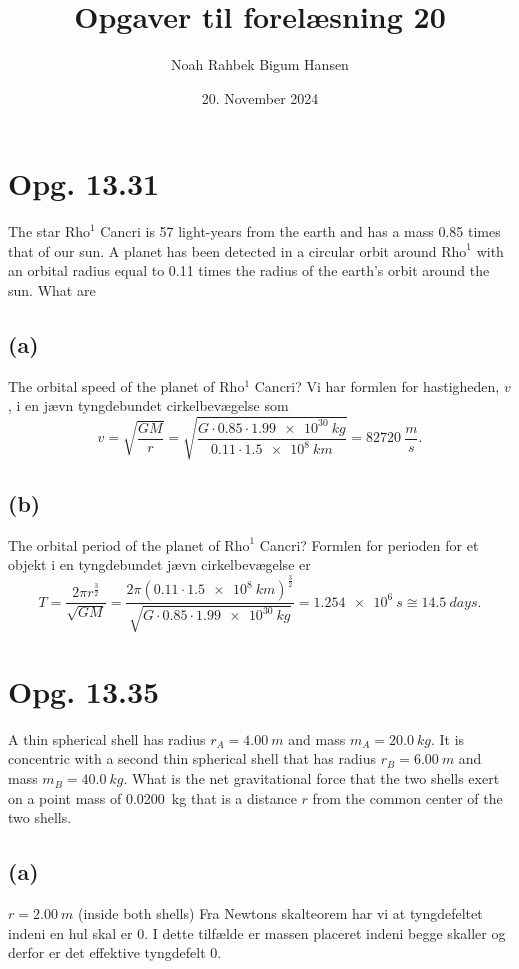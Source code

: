 \documentclass[12pt]{article}
\title{Opgaver til forelæsning 20}
\author{Noah Rahbek Bigum Hansen}
\date{20. November 2024}
\theoremstyle{definition}
\begin{document}
\maketitle

\section*{Opg. 13.31}
The star $\mathrm{Rho}^1$ Cancri is 57 light-years from the earth and has a mass \num{0,85} times that of our sun. A planet has been detected in a circular orbit around $\mathrm{Rho}^1$ with an orbital radius equal to \num{0,11} times the radius of the earth's orbit around the sun. What are

\subsection*{(a)}
The orbital speed of the planet of Rho$^1$ Cancri?
\bigbreak
Vi har formlen for hastigheden, $v$, i en jævn tyngdebundet cirkelbevægelse som
\[ 
v = \sqrt{\frac{GM}{r}} = \sqrt{\frac{G\cdot \num{0,85} \cdot \qty{1,99e30}{kg}}{\num{0,11} \cdot \qty{1,5e8}{km}}} = \qty{82720}{\frac{m}{s}} 
.\]


\subsection*{(b)}
The orbital period of the planet of $\mathrm{Rho}^1$ Cancri?
\bigbreak
Formlen for perioden for et objekt i en tyngdebundet jævn cirkelbevægelse er
\[ 
T = \frac{2\pi r^{\frac{3}{2}}}{\sqrt{GM}} = \frac{2\pi (\num{0,11} \cdot \qty{1,5e8}{km})^{\frac{3}{2}}}{\sqrt{G \cdot \num{0,85} \cdot \qty{1,99e30}{kg}}} = \qty{1,254e6}{s} \cong \qty{14,5}{days}
.\]


\section*{Opg. 13.35}
A thin spherical shell has radius $r_A = \qty{4,00}{m}$ and mass
$m_A = \qty{20,0}{kg}$. It is concentric with a second thin spherical shell that has radius $r_B = \qty{6,00}{m}$ and mass $m_B = \qty{40,0}{kg}$. What is the net gravitational force that the two shells exert on a point mass of \qty{0,0200}{kg}  that is a distance $r$ from the common center of the two shells.

\subsection*{(a)}
$r = \qty{2,00}{m}$ (inside both shells)
\bigbreak
Fra Newtons skalteorem har vi at tyngdefeltet indeni en hul skal er 0. I dette tilfælde er massen placeret indeni begge skaller og derfor er det effektive tyngdefelt 0.
\end{document}
